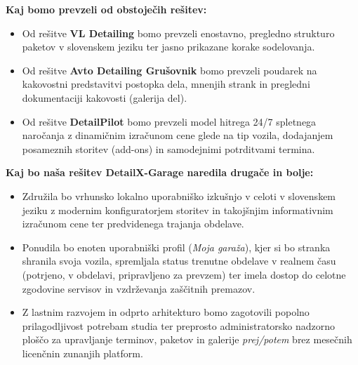 \documentclass[11pt,a4paper]{article}
\begin{document}
\textbf{Kaj bomo prevzeli od obstoječih rešitev:}
\begin{itemize}
  \item Od rešitve \textbf{VL Detailing} bomo prevzeli enostavno, pregledno strukturo paketov v slovenskem jeziku ter jasno prikazane korake sodelovanja.
  \item Od rešitve \textbf{Avto Detailing Grušovnik} bomo prevzeli poudarek na kakovostni predstavitvi postopka dela, mnenjih strank in pregledni dokumentaciji kakovosti (galerija del).
  \item Od rešitve \textbf{DetailPilot} bomo prevzeli model hitrega 24/7 spletnega naročanja z dinamičnim izračunom cene glede na tip vozila, dodajanjem posameznih storitev (add-ons) in samodejnimi potrditvami termina.
\end{itemize}

\textbf{Kaj bo naša rešitev DetailX-Garage naredila drugače in bolje:}
\begin{itemize}
  \item Združila bo vrhunsko lokalno uporabniško izkušnjo v celoti v slovenskem jeziku z modernim konfiguratorjem storitev in takojšnjim informativnim izračunom cene ter predvidenega trajanja obdelave.
  \item Ponudila bo enoten uporabniški profil (\emph{Moja garaža}), kjer si bo stranka shranila svoja vozila, spremljala status trenutne obdelave v realnem času (potrjeno, v obdelavi, pripravljeno za prevzem) ter imela dostop do celotne zgodovine servisov in vzdrževanja zaščitnih premazov.
  \item Z lastnim razvojem in odprto arhitekturo bomo zagotovili popolno prilagodljivost potrebam studia ter preprosto administratorsko nadzorno ploščo za upravljanje terminov, paketov in galerije \emph{prej/potem} brez mesečnih licenčnin zunanjih platform.
\end{itemize}
\end{document}
